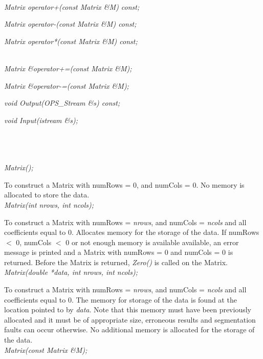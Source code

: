  \\ 
{\em Matrix operator+(const Matrix \&M) const;} 

{\em Matrix operator-(const Matrix \&M) const;} 

{\em Matrix operator*(const Matrix \&M) const;} 

 \\ 
{\em Matrix \&operator+=(const Matrix \&M); } 

{\em Matrix \&operator-=(const Matrix \&M); } 

{\em void Output(OPS_Stream \&s) const;} 

{\em void Input(istream \&s);} 

 \\ 
 \\ 


  \\
{\em Matrix();}  

To construct a Matrix with numRows = $0$, and numCols = $0$. No memory
is allocated to store the data.\\ 

{\em  Matrix(int nrows, int ncols);}  

To construct a Matrix with numRows = {\em nrows}, and numCols =
{\em ncols} and all coefficients equal to $0$. Allocates memory for
the storage of the data. If numRows $<$ $0$, numCols $<$ $0$ or not
enough memory is available available, an error message is printed and
a Matrix with numRows = $0$ and numCols = $0$ is returned. Before the
Matrix is returned, {\em Zero()} is called on the Matrix.\\ 

{\em  Matrix(double *data, int nrows, int ncols);}  

To construct a Matrix with numRows = {\em nrows}, and numCols =
{\em ncols} and all coefficients equal to $0$. The memory for storage
of the data is found at the location pointed to by {\em data}. Note
that this memory must have been previously allocated and it must be of
appropriate size, erroneous results and segmentation faults can occur
otherwise. No additional memory is allocated for the storage of the
data. \\ 

{\em Matrix(const Matrix \&M); }  

